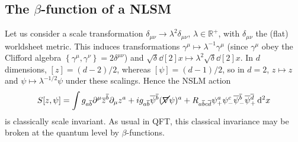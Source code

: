 
\subsection{The \texorpdfstring{$\beta$}{beta}-function of a NLSM}%
\label{sub:the_beta_function_of_a_nlsm}

Let us consider a scale transformation $\delta_{\mu\nu} \to \lambda^2 \delta_{\mu\nu}$, $\lambda \in \mathbb{R}^+$, with $\delta_{\mu\nu}$ the (flat) worldsheet metric. This induces transformations $\gamma^{\mu} \mapsto \lambda^{-1} \gamma^{\mu}$ (since $\gamma^{\mu}$ obey the Clifford algebra $\left\{\gamma^{\mu}, \gamma^{\nu}\right\} = 2 \delta^{\mu\nu}$) and $\sqrt{\delta} \dd[2]{x} \mapsto \lambda^2 \sqrt{\delta} \dd[2]{x}$. In $d$ dimensions, $[z] = (d - 2) / 2$, whereas $[\psi] = (d - 1) /2$, so in $d = 2$, $z \mapsto z$ and $\psi \mapsto \lambda^{-1 / 2} \psi$ under these scalings. Hence the NSLM action
\begin{equation}
  S[z, \psi] = \int g_{a \overline{b}{}} \partial^{\mu} \overline{z}{}^{\overline{b}{}} \partial_{\mu} z^{a} + i g_{a \overline{b}{}} \overline{\psi}{}^{\overline{b}{}} (\cancel{\nabla} \psi)^{a} + R_{a \overline{b}{} c \overline{d}{}} \psi^{a}_{+} \psi^{c}_- \overline{\psi}{}^{\overline{b}{}}_- \overline{\psi}{}^{\overline{d}{}}_+ \dd[2]{x}
\end{equation}
is classically scale invariant. As usual in QFT, this classical invariance may be broken at the quantum level by $\beta$-functions. 

